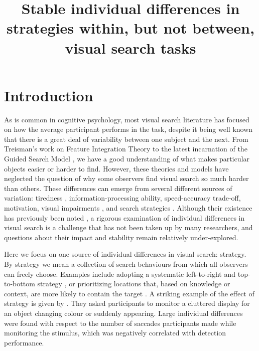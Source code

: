 \documentclass[a4paper, man, natbib, floatsintext]{apa6}
\title{Stable individual differences in strategies within, but not between, visual search tasks}
\begin{document}
\maketitle

\section{Introduction}

As is common in cognitive psychology, most visual search literature has focused on how the average participant performs in the task, despite it being well known that there is a great deal of variability between one subject and the next. From Treisman's work on Feature Integration Theory \citep{treisman1980} to the latest incarnation of the Guided Search Model \citep{wolfe2015}, we have a good understanding of what makes particular objects easier or harder to find. However, these theories and models have neglected the question of why some observers find visual search so much harder than others. These differences can emerge from several different sources of variation: tiredness \citep{mackworth1948}, information-processing ability, speed-accuracy trade-off, motivation, visual impairments \citep{nowakowska2016}, and search strategies \citep{boot2006}. Although their existence has previously been noted \citep{mackworth1948}, a rigorous examination of individual differences in visual search is a challenge that has not been taken up by many researchers, and questions about their impact and stability remain relatively under-explored. 


Here we focus on one source of individual differences in visual search: strategy. By strategy we mean a collection of search behaviours from which all observers can freely choose. Examples include adopting a systematic left-to-right and top-to-bottom strategy \citep{gilchrist2006}, or prioritizing locations that, based on knowledge or context, are more likely to contain the target \citep{wolfe2015}. A striking example of the effect of strategy is given by \cite{boot2006}. They asked participants to monitor a cluttered display for an object changing colour or suddenly appearing. Large individual differences were found with respect to the number of saccades participants made while monitoring the stimulus, which was negatively correlated with detection performance. 
\end{document}
